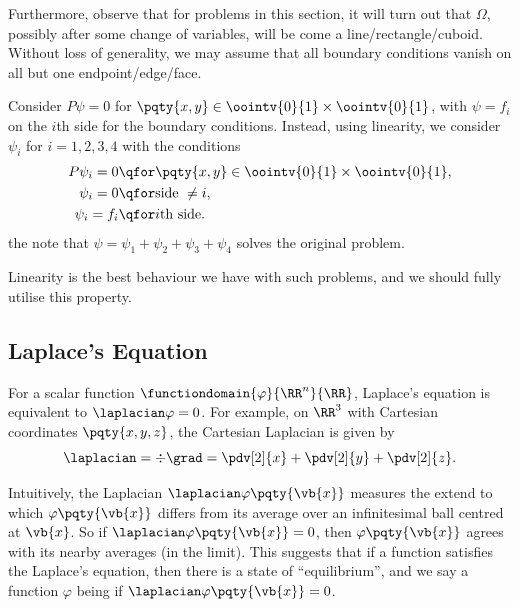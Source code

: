 {Furthermore, observe that for problems in this section, it will turn out that \(\Omega\), possibly after some change of variables, will be come a line/rectangle/cuboid. Without loss of generality, we may assume that all boundary conditions vanish on all but one endpoint/edge/face.

\begin{example}
    Consider \(P \psi = 0\) for \(\pqty{x, y} \in \oointv{0}{1} \times \oointv{0}{1}\), with \(\psi = f_i\) on the \(i\)th side for the boundary conditions. Instead, using linearity, we consider \(\psi_i\) for \(i = 1, 2, 3, 4\) with the conditions
    \begin{subequations}
        \begin{align}
            P \psi_i = 0 &\qfor \pqty{x, y} \in \oointv{0}{1} \times \oointv{0}{1}, \\
            \psi_i = 0 &\qfor \text{side }\neq i, \\
            \psi_i = f_i &\qfor i\text{th side}.
        \end{align}
    \end{subequations}
    the note that \(\psi = \psi_1 + \psi_2 + \psi_3 + \psi_4\) solves the original problem.
\end{example}

Linearity is the best behaviour we have with such problems, and we should fully utilise this property.

\subsection{Laplace's Equation}

For a scalar function \(\functiondomain{\varphi}{\RR^n}{\RR}\), Laplace's equation is equivalent to \(\laplacian 
\varphi = 0\). For example, on \(\RR^3\) with Cartesian coordinates \(\pqty{x, y, z}\), the Cartesian Laplacian is given by
\begin{equation}
    \laplacian = \div \grad = \pdv[2]{x} + \pdv[2]{y} + \pdv[2]{z}.
\end{equation}

Intuitively, the Laplacian \(\laplacian \varphi \pqty{\vb{x}}\) measures the extend to which \(\varphi\pqty{\vb{x}}\) differs from its average over an infinitesimal ball centred at \(\vb{x}\). So if \(\laplacian \varphi\pqty{\vb{x}} = 0\), then \(\varphi\pqty{\vb{x}}\) agrees with its nearby averages (in the limit). This suggests that if a function satisfies the Laplace's equation, then there is a state of ``equilibrium'', and we say a function \(\varphi\) being  if \(\laplacian \varphi\pqty{\vb{x}} = 0\).

}
